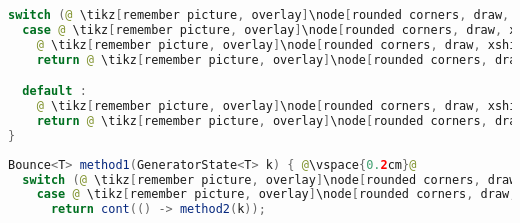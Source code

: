 \pagebreak

\begin{center}
\begin{mdframed}[topline=true]
\begin{minipage}[t]{0.4\textwidth}
\begin{lstlisting}[language=Java, numbers=none, breaklines=true]
switch (@ \tikz[remember picture, overlay]\node[rounded corners, draw, xshift=-0.1cm, inner sep=5pt, anchor=west, yshift=0.1cm] {Szelektor}; \vspace*{0.3cm} \hspace*{1.35cm}@) {
  case @ \tikz[remember picture, overlay]\node[rounded corners, draw, xshift=-0.1cm, inner sep=5pt, anchor=west, yshift=0.1cm] {Konstans}; \vspace*{0.3cm} \hspace*{1.35cm}@:
    @ \tikz[remember picture, overlay]\node[rounded corners, draw, xshift=-0.1cm, inner sep=5pt, anchor=west] {Kódrészlet \#1}; \vspace*{0.5cm} @ 
    return @ \tikz[remember picture, overlay]\node[rounded corners, draw, xshift=-0.1cm, inner sep=5pt, anchor=west, yshift=0.1cm] {Kifejezés \#1}; \vspace*{0.3cm} @

  default :
    @ \tikz[remember picture, overlay]\node[rounded corners, draw, xshift=-0.1cm, inner sep=5pt, anchor=west] {Kódrészlet \#2}; \vspace*{0.5cm} @ 
    return @ \tikz[remember picture, overlay]\node[rounded corners, draw, xshift=-0.1cm, inner sep=5pt, anchor=west, yshift=0.1cm] {Kifejezés \#2}; \vspace*{0.3cm} @
}
\end{lstlisting}
\end{minipage} 
\begin{minipage}[t]{0.6\textwidth}
\begin{lstlisting}[language=Java, numbers=none, breaklines=true]
Bounce<T> method1(GeneratorState<T> k) { @\vspace{0.2cm}@
  switch (@ \tikz[remember picture, overlay]\node[rounded corners, draw, xshift=-0.1cm, inner sep=5pt, anchor=west, yshift=0.1cm] {Szelektor}; \vspace*{0.3cm} \hspace*{1.35cm}@) {
    case @ \tikz[remember picture, overlay]\node[rounded corners, draw, xshift=-0.1cm, inner sep=5pt, anchor=west, yshift=0.1cm] {Konstans}; \vspace*{0.1cm} \hspace*{1.35cm}@:
      return cont(() -> method2(k));


\end{lstlisting}
\end{minipage}
\end{mdframed}
\end{center}
